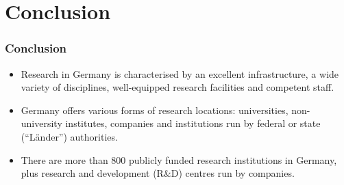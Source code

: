 \documentclass[9pt, compress]{beamer}
\begin{document}
    \section{Conclusion}
    \begin{frame} 
        \frametitle{Conclusion}
        \begin{itemize}
            \item Research in Germany is characterised by an excellent infrastructure, a wide variety of disciplines, well-equipped research facilities and competent staff.\\
            \item Germany offers various forms of research locations: universities, non-university institutes, companies and institutions run by federal or state (“Länder”) authorities.\\
            \item There are more than 800 publicly funded research institutions in Germany, plus research and development (R\&D) centres run by companies.
        \end{itemize}
    \end{frame}
\end{document}
